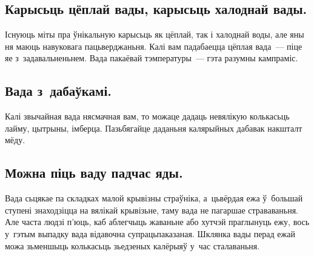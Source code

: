 \subsection{Карысьць цёплай вады, карысьць халоднай вады.}
Існуюць міты пра ўнікальную карысьць як цёплай, так і халоднай воды, але яны ня маюць навуковага пацьверджаньня. Калі вам падабаецца цёплая вада~--- піце яе з~задавальненьнем. Вада пакаёвай тэмпературы~--- гэта разумны кампраміс.

\subsection{Вада з~дабаўкамі.}
Калі звычайная вада нясмачная вам, то можаце дадаць невялікую колькасьць лайму, цытрыны, імберца. Пазьбягайце даданьня калярыйных дабавак накшталт мёду.

\subsection{Можна піць ваду падчас яды.}
Вада сьцякае па складках малой крывізны страўніка, а~цьвёрдая ежа ў~большай ступені знаходзіцца на вялікай крывізьне, таму вада не пагаршае страваваньня. Але часта людзі п'юць, каб аблегчыць жаваньне або хутчэй праглынуць ежу, вось у~гэтым выпадку вада відавочна супрацьпаказаная. Шклянка вады перад ежай можа зьменшыць колькасьць зьедзеных калёрыяў у~час сталаваньня.
